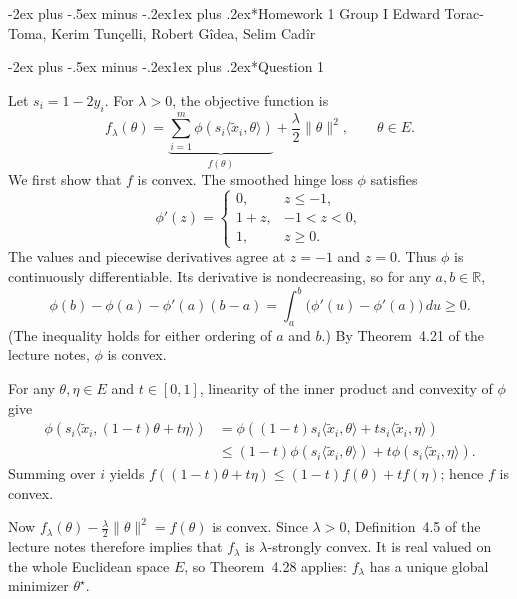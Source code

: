 \documentclass[11pt,a4paper]{article}
\makeatletter
\renewcommand\section{\@startsection{section}{1}{\z@}%
  {-2ex plus -.5ex minus -.2ex}{1ex plus .2ex}{\normalfont\Large\bfseries}}
\makeatother
\begin{document}
\section*{Homework 1 Group I}
Edward Torac-Toma, Kerim Tunçelli, Robert Gîdea, Selim Cadîr

\section*{Question 1}

Let \(s_i=1-2y_i\). For \(\lambda>0\), the objective function is
\[
f_\lambda(\theta)
=
\underbrace{\sum_{i=1}^{m}
\phi\!\left(s_i\langle\widetilde{x}_i,\theta\rangle\right)}_{f(\theta)}
+\frac{\lambda}{2}\|\theta\|^2,
\qquad \theta\in E.
\]
We first show that \(f\) is convex. The smoothed hinge loss \(\phi\) satisfies
\[
\phi'(z)=
\begin{cases}
0, & z\leq -1,\\
1+z, & -1<z<0,\\
1, & z\geq 0.
\end{cases}
\]
The values and piecewise derivatives agree
at \(z=-1\) and \(z=0\). Thus \(\phi\) is continuously differentiable.
Its derivative is nondecreasing, so for any \(a,b\in\mathbb R\),
\[
\phi(b)-\phi(a)-\phi'(a)(b-a)
=\int_a^b \bigl(\phi'(u)-\phi'(a)\bigr)\,du\geq 0.
\]
(The inequality holds for either ordering of \(a\) and \(b\).)
By Theorem~4.21 of the lecture notes, \(\phi\) is convex.

For any \(\theta,\eta\in E\) and \(t\in[0,1]\), linearity of the inner
product and convexity of \(\phi\) give
\begin{align*}
\phi\!\left(s_i\langle\widetilde{x}_i,(1-t)\theta+t\eta\rangle\right)
&=\phi\!\left((1-t)s_i\langle\widetilde{x}_i,\theta\rangle
+t s_i\langle\widetilde{x}_i,\eta\rangle\right)\\
&\leq (1-t)\phi\!\left(s_i\langle\widetilde{x}_i,\theta\rangle\right)
+t\phi\!\left(s_i\langle\widetilde{x}_i,\eta\rangle\right).
\end{align*}
Summing over \(i\) yields
\(f((1-t)\theta+t\eta)\leq(1-t)f(\theta)+tf(\eta)\);
hence \(f\) is convex.

Now $f_\lambda(\theta)-\frac{\lambda}{2}\|\theta\|^2=f(\theta)$
is convex. Since $\lambda>0$, Definition~4.5 of the lecture notes therefore implies that \(f_\lambda\) is \(\lambda\)-strongly convex.
It is real valued on the whole Euclidean space \(E\), so Theorem~4.28 applies: \(f_\lambda\) has a unique global minimizer \(\theta^\star\).
\end{document}
